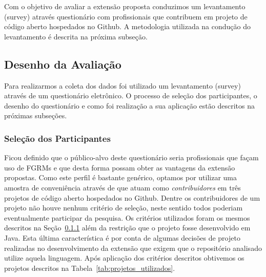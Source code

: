 Com o objetivo de avaliar a extensão proposta conduzimos um levantamento
(survey) através questionário com profissionais que contribuem em projeto de
código aberto hospedados no Github. A metodologia utilizada na condução do
levantamento é descrita na próxima subseção.

\subsection{Desenho da Avaliação}
\label{sub:implementacao_extenscao_desenho_da_avaliacao}

Para realizarmos a coleta dos dados foi utilizado um levantamento (survey)
através de um questionário eletrônico. O processo de seleção dos participantes,
o desenho do questionário e como foi realização a sua aplicação estão descritos
na próximas subseções.

\subsubsection{Seleção dos Participantes}
\label{ssub:sug_melhoria_selecao_participantes}

Ficou definido que o público-alvo deste questionário seria profissionais que
façam uso de FGRMs e que desta forma possam obter as vantagens da extensão
propostas. Como este perfil é bastante genérico, optamos por utilizar uma
amostra de conveniência através de que atuam como \textit{contribuidores} em
três projetos de código aberto hospedados no Github. Dentre os contribuidores de
um projeto não houve nenhum critério de seleção, neste sentido todos poderiam
eventualmente participar da pesquisa. Os critérios utilizados foram os mesmos
descritos na Seção~\ref{ssub:sug_melhoria_selecao_participantes} além da
restrição que o projeto fosse desenvolvido em Java. Esta última característica é
por conta de algumas decisões de projeto realizadas no desenvolvimento da
extensão que exigem que o repositório analisado utilize aquela linguagem. Após
aplicação dos critérios descritos obtivemos os projetos descritos na
Tabela~\ref{tab:projetos_utilizados}.

\begin{table}[htpb]
\centering
{}
\caption{Projetos utilizados no levantamento com profissionais. Os dados
	apresentados tem como referência 23/04/2017.}
\label{tab:projetos_utilizados}
\end{table}

